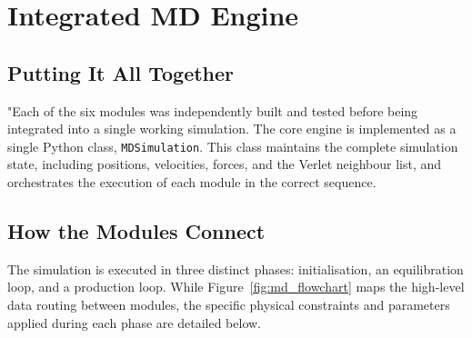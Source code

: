 
\section{Integrated MD Engine}

\subsection{Putting It All Together}

"Each of the six modules was independently built and tested before being integrated into a single working simulation. The core engine is implemented as a single Python class, \texttt{MDSimulation}. This class maintains the complete simulation state, including positions, velocities, forces, and the Verlet neighbour list, and orchestrates the execution of each module in the correct sequence.

\subsection{How the Modules Connect}

The simulation is executed in three distinct phases: initialisation, an equilibration loop, and a production loop. While Figure~\ref{fig:md_flowchart} maps the high-level data routing between modules, the specific physical constraints and parameters applied during each phase are detailed below.


